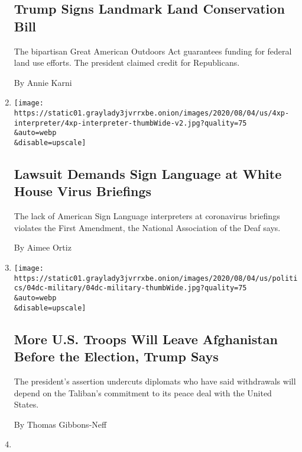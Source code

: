 \begin{enumerate}
{  \subsection{Trump Signs Landmark Land Conservation
  Bill}\label{trump-signs-landmark-land-conservation-bill}}

  The bipartisan Great American Outdoors Act guarantees funding for
  federal land use efforts. The president claimed credit for
  Republicans.

  By Annie Karni
\item
  \href{/2020/08/04/us/politics/asl-interpreter-lawsuit-coronavirus-trump.html}{}

  \texttt{[image: https://static01.graylady3jvrrxbe.onion/images/2020/08/04/us/4xp-interpreter/4xp-interpreter-thumbWide-v2.jpg?quality=75\\\&auto=webp\\\&disable=upscale]}

  \hypertarget{lawsuit-demands-sign-language-at-white-house-virus-briefings}{%
  \subsection{Lawsuit Demands Sign Language at White House Virus
  Briefings}\label{lawsuit-demands-sign-language-at-white-house-virus-briefings}}

  The lack of American Sign Language interpreters at coronavirus
  briefings violates the First Amendment, the National Association of
  the Deaf says.

  By Aimee Ortiz
\item
  \href{/2020/08/04/world/asia/us-troops-afghanistan.html}{}

  \texttt{[image: https://static01.graylady3jvrrxbe.onion/images/2020/08/04/us/politics/04dc-military/04dc-military-thumbWide.jpg?quality=75\\\&auto=webp\\\&disable=upscale]}

  \hypertarget{more-us-troops-will-leave-afghanistan-before-the-election-trump-says}{%
  \subsection{More U.S. Troops Will Leave Afghanistan Before the
  Election, Trump
  Says}\label{more-us-troops-will-leave-afghanistan-before-the-election-trump-says}}

  The president's assertion undercuts diplomats who have said
  withdrawals will depend on the Taliban's commitment to its peace deal
  with the United States.

  By Thomas Gibbons-Neff
\item
  \href{/2020/08/04/us/politics/trump-immigration-wealth-test.html}{}


\end{enumerate}
